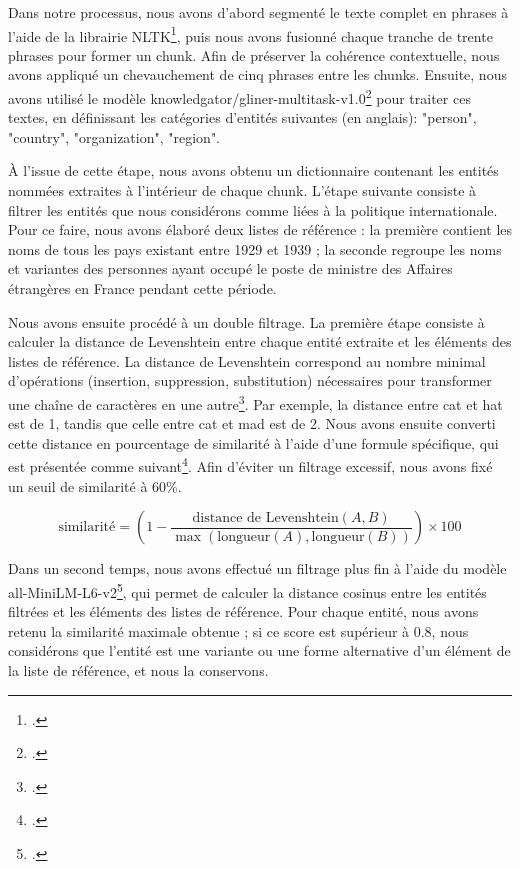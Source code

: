 \documentclass[a4paper,twoside,12pt]{book}
\begin{document}
Dans notre processus, nous avons d'abord segmenté le texte complet en phrases à l'aide de la librairie NLTK\footcite{bird2004}, puis nous avons fusionné chaque tranche de trente phrases pour former un chunk. Afin de préserver la cohérence contextuelle, nous avons appliqué un chevauchement de cinq phrases entre les chunks. Ensuite, nous avons utilisé le modèle knowledgator/gliner-multitask-v1.0\footcite{2024d} pour traiter ces textes, en définissant les catégories d'entités suivantes (en anglais): "person", "country", "organization", "region".

À l'issue de cette étape, nous avons obtenu un dictionnaire contenant les entités nommées extraites à l'intérieur de chaque chunk. L'étape suivante consiste à filtrer les entités que nous considérons comme liées à la politique internationale. Pour ce faire, nous avons élaboré deux listes de référence : la première contient les noms de tous les pays existant entre 1929 et 1939 ; la seconde regroupe les noms et variantes des personnes ayant occupé le poste de ministre des Affaires étrangères en France pendant cette période.

Nous avons ensuite procédé à un double filtrage. La première étape consiste à calculer la distance de Levenshtein entre chaque entité extraite et les éléments des listes de référence. La distance de Levenshtein correspond au nombre minimal d'opérations (insertion, suppression, substitution) nécessaires pour transformer une chaîne de caractères en une autre\footcite{levenshteyn}. Par exemple, la distance entre cat et hat est de 1, tandis que celle entre cat et mad est de 2. Nous avons ensuite converti cette distance en pourcentage de similarité à l'aide d'une formule spécifique, qui est présentée comme suivant\footcite{zotero-734}. Afin d'éviter un filtrage excessif, nous avons fixé un seuil de similarité à 60\%.

\[
\text{similarité} = \left(1 - \frac{\text{distance de Levenshtein}(A, B)}{\max(\text{longueur}(A), \text{longueur}(B))} \right) \times 100
\]


Dans un second temps, nous avons effectué un filtrage plus fin à l'aide du modèle all-MiniLM-L6-v2\footcite{2024e}, qui permet de calculer la distance cosinus entre les entités filtrées et les éléments des listes de référence. Pour chaque entité, nous avons retenu la similarité maximale obtenue ; si ce score est supérieur à 0.8, nous considérons que l'entité est une variante ou une forme alternative d'un élément de la liste de référence, et nous la conservons.
\end{document}
